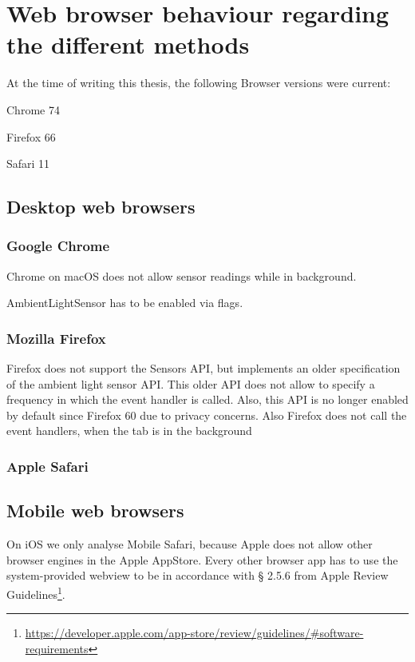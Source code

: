 \documentclass[article,type=bsc,colorback,accentcolor=tud9c]{tudthesis}
\begin{document}
  \newpage
  \section{Web browser behaviour regarding the different methods}

  At the time of writing this thesis, the following Browser versions were current:

  Chrome 74
  
  Firefox 66
  
  Safari 11

  
  \subsection{Desktop web browsers}

  \subsubsection{Google Chrome}

  Chrome on macOS does not allow sensor readings while in background.

  AmbientLightSensor has to be enabled via flags.
  
  \subsubsection{Mozilla Firefox}

  Firefox does not support the Sensors API, but implements an older specification of the ambient light sensor API. This older API does not allow to specify a frequency in which the event handler is called. Also, this API is no longer enabled by default since Firefox 60 due to privacy concerns. Also Firefox does not call the event handlers, when the tab is in the background

  \subsubsection{Apple Safari}

  \subsection{Mobile web browsers}

  On iOS we only analyse Mobile Safari, because Apple does not allow other browser engines in the Apple AppStore. Every other browser app has to use the system-provided webview to be in accordance with § 2.5.6 from Apple Review Guidelines\footnote{\url{https://developer.apple.com/app-store/review/guidelines/\#software-requirements}}.
\end{document}
